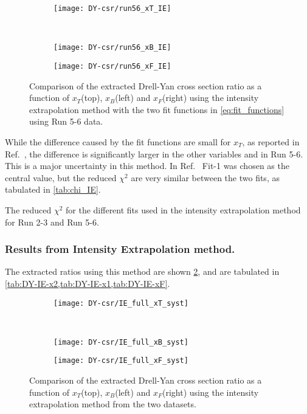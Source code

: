 \documentclass[../main.tex]{subfiles}
\begin{document}
\begin{figure}[h!]
	\centering
	\begin{subfigure}{0.6\linewidth}
		\texttt{[image: DY-csr/run56\_xT\_IE]}
	\end{subfigure}\\
	\begin{subfigure}{0.45\linewidth}
		\texttt{[image: DY-csr/run56\_xB\_IE]}
	\end{subfigure}
	\begin{subfigure}{0.45\linewidth}
		\texttt{[image: DY-csr/run56\_xF\_IE]}
	\end{subfigure}
	\caption{Comparison of the extracted Drell-Yan cross section ratio as a function of $x_T$(top),
		$x_B$(left) and $x_F$(right) using the intensity extrapolation method with the two fit functions in \cref{eq:fit_functions}
		using Run 5-6 data.}
	\label{fig:CSR_IE_run56}
\end{figure}

While the difference caused by the fit functions are small for $x_T$, as reported in Ref.~\cite{dove2021},
the difference is significantly larger in the other variables and in Run 5-6.
This is a major uncertainty in this method. 
In Ref.~\cite{dove2021} Fit-1 was chosen as the central value, but the reduced $\chi^2$ are very similar between the two fits,
as tabulated in \cref{tab:chi_IE}.
\begin{table}[h!]
	\centering
	\caption{The reduced $\chi^2$ for the different fits used in the intensity extrapolation method for Run 2-3 and Run 5-6. }
	\label{tab:chi_IE}
	
\end{table}



\subsubsection{Results from Intensity Extrapolation method.}
The extracted ratios using this method are shown \cref{fig:CSR_IE},
and are tabulated in \cref{tab:DY-IE-x2,tab:DY-IE-x1,tab:DY-IE-xF}.
\begin{figure}[h!]
	\centering
	\begin{subfigure}{0.6\linewidth}
		\texttt{[image: DY-csr/IE\_full\_xT\_syst]}
	\end{subfigure}\\
	\begin{subfigure}{0.45\linewidth}
		\texttt{[image: DY-csr/IE\_full\_xB\_syst]}
	\end{subfigure}
	\begin{subfigure}{0.45\linewidth}
		\texttt{[image: DY-csr/IE\_full\_xF\_syst]}
	\end{subfigure}
	\caption{Comparison of the extracted Drell-Yan cross section ratio as a function of $x_T$(top),
		$x_B$(left) and $x_F$(right) using the intensity extrapolation method from the two datasets.}
	\label{fig:CSR_IE}
\end{figure}
\end{document}
